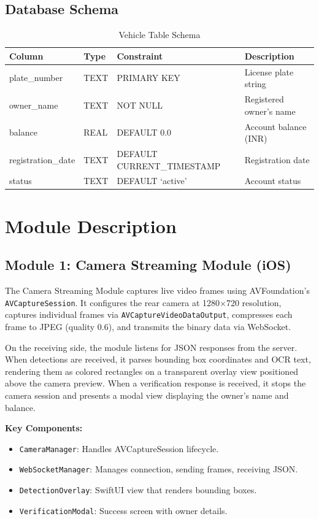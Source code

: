 \subsection{Database Schema}
\begin{table}[H]
\centering
\caption{Vehicle Table Schema}
\renewcommand{\arraystretch}{1.3}
\begin{tabular}{|l|l|l|l|}
\hline
\textbf{Column} & \textbf{Type} & \textbf{Constraint} & \textbf{Description} \\
\hline
plate\_number & TEXT & PRIMARY KEY & License plate string \\
\hline
owner\_name & TEXT & NOT NULL & Registered owner's name \\
\hline
balance & REAL & DEFAULT 0.0 & Account balance (INR) \\
\hline
registration\_date & TEXT & DEFAULT CURRENT\_TIMESTAMP & Registration date \\
\hline
status & TEXT & DEFAULT `active' & Account status \\
\hline
\end{tabular}
\end{table}

\section{Module Description}

\subsection{Module 1: Camera Streaming Module (iOS)}
The Camera Streaming Module captures live video frames using AVFoundation's \texttt{AVCaptureSession}. It configures the rear camera at 1280$\times$720 resolution, captures individual frames via \texttt{AVCaptureVideoDataOutput}, compresses each frame to JPEG (quality 0.6), and transmits the binary data via WebSocket.

On the receiving side, the module listens for JSON responses from the server. When detections are received, it parses bounding box coordinates and OCR text, rendering them as colored rectangles on a transparent overlay view positioned above the camera preview. When a verification response is received, it stops the camera session and presents a modal view displaying the owner's name and balance.

\textbf{Key Components:}
\begin{itemize}
    \item \texttt{CameraManager}: Handles AVCaptureSession lifecycle.
    \item \texttt{WebSocketManager}: Manages connection, sending frames, receiving JSON.
    \item \texttt{DetectionOverlay}: SwiftUI view that renders bounding boxes.
    \item \texttt{VerificationModal}: Success screen with owner details.
\end{itemize}

